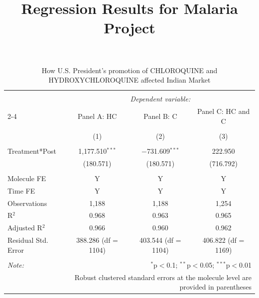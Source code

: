 \documentclass[12pt,english]{article}
\begin{document}
\title{Regression Results for Malaria Project}
\author{}
\maketitle

\begin{table}[H] \centering 
	\caption{How U.S. President's promotion of CHLOROQUINE and HYDROXYCHLOROQUINE affected Indian Market} 
	\label{} 
	\footnotesize 
	\begin{tabular}{@{\extracolsep{1pt}}lccc} 
		\\[-1.8ex]\hline 
		\hline \\[-1.8ex] 
		& \multicolumn{3}{c}{\textit{Dependent variable:}} \\ 
		\cline{2-4} 
		& Panel A: HC & Panel B: C & Panel C: HC and C \\ 
		\\[-1.8ex] & (1) & (2) & (3)\\ 
		\hline \\[-1.8ex] 
		Treatment*Post & 1,177.510$^{***}$ & $-$731.609$^{***}$ & 222.950 \\ 
		& (180.571) & (180.571) & (716.792) \\ 
		\hline \\[-1.8ex] 
		Molecule FE & Y & Y & Y \\ 
		Time FE & Y & Y & Y \\ 
		Observations & 1,188 & 1,188 & 1,254 \\ 
		R$^{2}$ & 0.968 & 0.963 & 0.965 \\ 
		Adjusted R$^{2}$ & 0.966 & 0.960 & 0.962 \\ 
		Residual Std. Error & 388.286 (df = 1104) & 403.544 (df = 1104) & 406.822 (df = 1169) \\ 
		\hline 
		\hline \\[-1.8ex] 
		\textit{Note:}  & \multicolumn{3}{r}{$^{*}$p$<$0.1; $^{**}$p$<$0.05; $^{***}$p$<$0.01} \\ 
		& \multicolumn{3}{r}{Robust clustered standard errors at the molecule level are provided in parentheses} \\ 
	\end{tabular} 
\end{table} 
\end{document}
